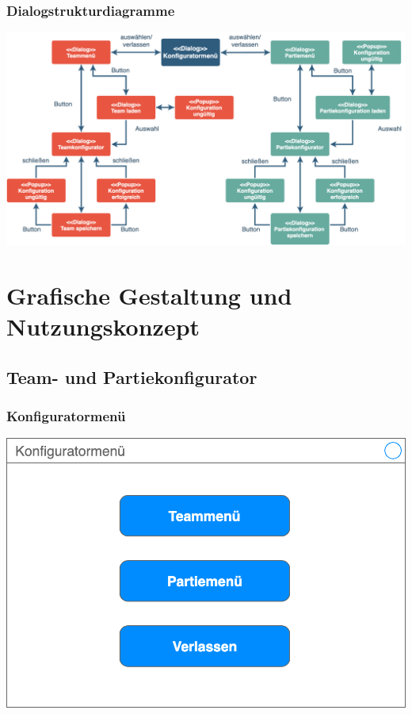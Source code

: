 \documentclass[a4paper,12pt,
headsepline,           %
oneside,               %
pointlessnumbers,      %
bibtotoc,              %
]{scrartcl}
\begin{document}
	\subsubsection{Dialogstrukturdiagramme}    
	
	\includegraphics[width=15.5cm]{images/dialogstruktur_konfigurator}
	
	\section{Grafische Gestaltung und Nutzungskonzept}
	
	\subsection{Team- und Partiekonfigurator}
	
	\subsubsection{Konfiguratormenü}
	
	\includegraphics[scale=0.2]{images/konfiguratormenue}
	
\end{document}
